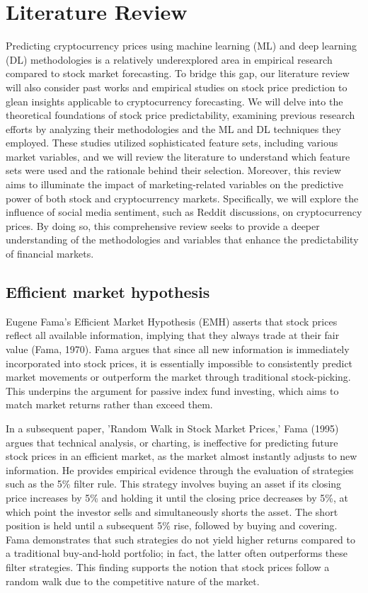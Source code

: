 \chapter*{Literature Review}
\setcounter{chapter}{2}

Predicting cryptocurrency prices using machine learning (ML) and deep learning (DL) methodologies is a relatively underexplored area in empirical research compared to stock market forecasting. To bridge this gap, our literature review will also consider past works and empirical studies on stock price prediction to glean insights applicable to cryptocurrency forecasting.
We will delve into the theoretical foundations of stock price predictability, examining previous research efforts by analyzing their methodologies and the ML and DL techniques they employed. These studies utilized sophisticated feature sets, including various market variables, and we will review the literature to understand which feature sets were used and the rationale behind their selection.
Moreover, this review aims to illuminate the impact of marketing-related variables on the predictive power of both stock and cryptocurrency markets. Specifically, we will explore the influence of social media sentiment, such as Reddit discussions, on cryptocurrency prices. By doing so, this comprehensive review seeks to provide a deeper understanding of the methodologies and variables that enhance the predictability of financial markets.

\section{Efficient market hypothesis}

Eugene Fama's Efficient Market Hypothesis (EMH) asserts that stock prices reflect all available information, implying that they always trade at their fair value (Fama, 1970). Fama argues that since all new information is immediately incorporated into stock prices, it is essentially impossible to consistently predict market movements or outperform the market through traditional stock-picking. This underpins the argument for passive index fund investing, which aims to match market returns rather than exceed them.

In a subsequent paper, 'Random Walk in Stock Market Prices,' Fama (1995) argues that technical analysis, or charting, is ineffective for predicting future stock prices in an efficient market, as the market almost instantly adjusts to new information. He provides empirical evidence through the evaluation of strategies such as the 5\% filter rule. This strategy involves buying an asset if its closing price increases by 5\% and holding it until the closing price decreases by 5\%, at which point the investor sells and simultaneously shorts the asset. The short position is held until a subsequent 5\% rise, followed by buying and covering. Fama demonstrates that such strategies do not yield higher returns compared to a traditional buy-and-hold portfolio; in fact, the latter often outperforms these filter strategies. This finding supports the notion that stock prices follow a random walk due to the competitive nature of the market.

